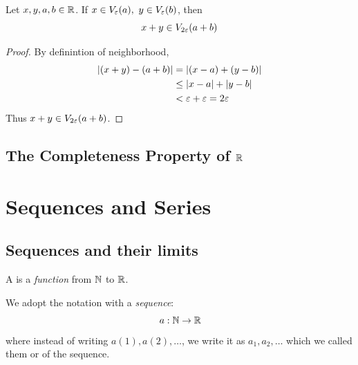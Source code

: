 \documentclass[a4paper,12pt]{article}
\begin{document}
\begin{proposition}
    Let \(x,y,a,b\in\mathbb{R}\). If \(x\in\neighbor{\varepsilon}{a},\ y\in\neighbor{\varepsilon}{b}\), then 
    \[x+y\in V_{2\varepsilon}{(a+b)}\]
    \begin{proof} By definintion of neighborhood,
        \begin{align*}
            \left\lvert (x+y)-(a+b)\right\rvert&=\left\lvert (x-a)+(y-b)\right\rvert\\
            &\le\left\lvert x-a\right\rvert+\left\lvert y-b\right\rvert\\
            &<\varepsilon+\varepsilon=2\varepsilon
        \end{align*}
        Thus \(x+y\in V_{2\varepsilon}{(a+b)}\).
    \end{proof}
\end{proposition}

\newpage

\subsection{The Completeness Property of $\mathbb{R}$}






\newpage
\section{Sequences and Series}
\subsection{Sequences and their limits}

\begin{definition}
    A  is a \textit{function} from $\mathbb{N}$ to $\mathbb{R}$.
\end{definition}


We adopt the notation with a \textit{sequence}:
\[\,a:\mathbb{N}\rightarrow\mathbb{R}\]
where instead of writing \(a(1), a(2), \dots\), we write it as \(a_1, a_2, \dots\) which we called them 
 or  of the sequence.\\
\end{document}
